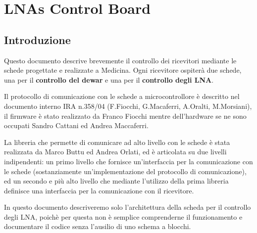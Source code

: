 \chapter{LNAs Control Board}

\section{Introduzione}

Questo documento descrive brevemente il controllo dei ricevitori mediante le schede 
progettate e realizzate a Medicina. Ogni ricevitore ospiter\`a due schede, una per
il \textbf{controllo del dewar} e una per il \textbf{controllo degli LNA}.

Il protocollo di comunicazione con le schede a microcontrollore \`e descritto nel documento interno 
IRA n.358/04 (F.Fiocchi, G.Macaferri, A.Oralti, M.Morsiani), il firmware \`e stato 
realizzato da Franco Fiocchi mentre dell'hardware se ne sono occupati Sandro Cattani
ed Andrea Maccaferri.

La libreria che permette di comunicare ad alto livello con le schede \`e stata realizzata da Marco Buttu
ed Andrea Orlati, ed \`e articolata su due livelli indipendenti: un primo livello che fornisce
un'interfaccia per la comunicazione con le schede (sostanziamente un'implementazione del protocollo di
comunicazione), ed un secondo e pi\`u alto livello che mediante l'utilizzo della prima libreria definisce
una interfaccia per la comunicazione con il ricevitore.

In questo documento descriveremo solo l'architettura della scheda per il controllo degli LNA, poich\`e per
questa non \`e semplice comprenderne il funzionamento e documentare il codice senza l'ausilio di
uno schema a blocchi.

